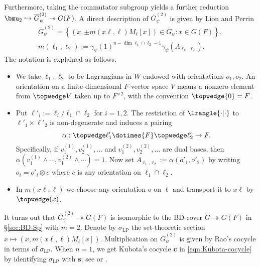 \documentclass[a4paper,10pt]{article}
\begin{document}
Furthermore, taking the commutator subgroup yields a further reduction $\bmu_2 \hookrightarrow \overline{G}_\psi^{(2)} \twoheadrightarrow G(F)$. A direct description of $\overline{G}_\psi^{(2)}$ is given by Lion and Perrin \cite{Per81}
\begin{gather*}
	\overline{G}_\psi^{(2)} = \left\{ (x, \pm m(x\ell, \ell) M_\ell[x]) \in \overline{G}_\psi : x \in G(F) \right\}, \\
	m(\ell_1, \ell_2) := \gamma_\psi(1)^{n - \dim \ell_1 \cap \ell_2 - 1 } \gamma_\psi(A_{\ell_1, \ell_2}).
\end{gather*}
The notation is explained as follows.
\begin{itemize}
	\item We take $\ell_1, \ell_2$ to be Lagrangians in $W$ endowed with orientations $o_1, o_2$. An orientation on a finite-dimensional $F$-vector space $V$ means a nonzero element from $\topwedge V$ taken up to $F^{\times 2}$, with the convention $\topwedge \{0\} = F$.
	\item Put $\ell'_i := \ell_i/\ell_1 \cap \ell_2$ for $i=1,2$. The restriction of $\lrangle{\cdot|\cdot}$ to $\ell'_1 \times \ell'_2$ is non-degenerate and induces a pairing
	\[ \alpha: \topwedge \ell'_1 \dotimes{F} \topwedge \ell'_2 \to F. \]
	Specifically, if $v^{(1)}_1, v^{(1)}_2, \ldots$ and $v^{(2)}_1, v^{(2)}_2, \ldots$ are dual bases, then $\alpha\left( v^{(1)}_1 \wedge \cdots, v^{(2)}_1 \wedge \cdots \right) = 1$. Now set $A_{\ell_1, \ell_2} := \alpha(o'_1, o'_2)$ by writing $o_i = o'_i \otimes c$ where $c$ is any orientation on $\ell_1 \cap \ell_2$.
	\item In $m(x\ell, \ell)$ we choose any orientation $o$ on $\ell$ and transport it to $x\ell$ by $\topwedge(x)$.
\end{itemize}
It turns out that $\overline{G}_\psi^{(2)} \twoheadrightarrow G(F)$ is isomorphic to the BD-cover $\tilde{G} \twoheadrightarrow G(F)$ in \S\ref{sec:BD-Sp} with $m=2$. Denote by $\sigma_\text{LP}$ the set-theoretic section $x \mapsto (x, m(x\ell, \ell)M_\ell[x])$. Multiplication on $\overline{G}_\psi^{(2)}$ is given by Rao's cocycle in terms of $\sigma_\text{LP}$. When $n=1$, we get Kubota's cocycle $\bm{c}$ in \eqref{eqn:Kubota-cocycle} by identifying $\sigma_{\text{LP}}$ with $\bm{s}$; see \cite[Chapitre 3, I.3]{MVW87} or \cite[2.4.2]{Per81}.
\end{document}
